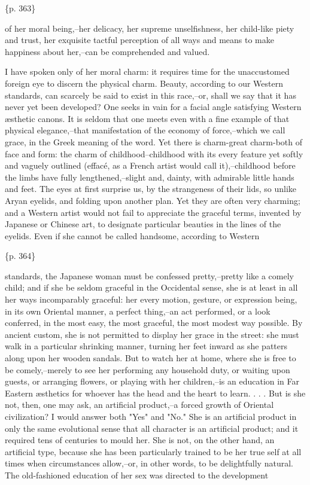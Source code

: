 \{p. 363\}

of her moral being,--her delicacy, her supreme unselfishness, her child-like piety and trust, her exquisite tactful perception of all ways and means to make happiness about her,--can be comprehended and valued.

I have spoken only of her moral charm: it requires time for the unaccustomed foreign eye to discern the physical charm. Beauty, according to our Western standards, can scarcely be said to exist in this race,--or, shall we say that it has never yet been developed? One seeks in vain for a facial angle satisfying Western æsthetic canons. It is seldom that one meets even with a fine example of that physical elegance,--that manifestation of the economy of force,--which we call grace, in the Greek meaning of the word. Yet there is charm-great charm-both of face and form: the charm of childhood--childhood with its every feature yet softly and vaguely outlined (effacé, as a French artist would call it),--childhood before the limbs have fully lengthened,--slight and, dainty, with admirable little hands and feet. The eyes at first surprise us, by the strangeness of their lids, so unlike Aryan eyelids, and folding upon another plan. Yet they are often very charming; and a Western artist would not fail to appreciate the graceful terms, invented by Japanese or Chinese art, to designate particular beauties in the lines of the eyelids. Even if she cannot be called handsome, according to Western

\{p. 364\}

standards, the Japanese woman must be confessed pretty,--pretty like a comely child; and if she be seldom graceful in the Occidental sense, she is at least in all her ways incomparably graceful: her every motion, gesture, or expression being, in its own Oriental manner, a perfect thing,--an act performed, or a look conferred, in the most easy, the most graceful, the most modest way possible. By ancient custom, she is not permitted to display her grace in the street: she must walk in a particular shrinking manner, turning her feet inward as she patters along upon her wooden sandals. But to watch her at home, where she is free to be comely,--merely to see her performing any household duty, or waiting upon guests, or arranging flowers, or playing with her children,--is an education in Far Eastern æsthetics for whoever has the head and the heart to learn. . . . But is she not, then, one may ask, an artificial product,--a forced growth of Oriental civilization? I would answer both "Yes" and "No." She is an artificial product in only the same evolutional sense that all character is an artificial product; and it required tens of centuries to mould her. She is not, on the other hand, an artificial type, because she has been particularly trained to be her true self at all times when circumstances allow,--or, in other words, to be delightfully natural. The old-fashioned education of her sex was directed to the development


